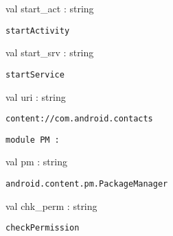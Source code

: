 \documentclass[11pt]{article}
\begin{document}
\begin{ocamldocsigend}
\begin{ocamldocdescription}
\end{ocamldocdescription}


\label{val:Android.Content.start-underscoreact}\begin{ocamldoccode}
val start_act : string
\end{ocamldoccode}
\begin{ocamldocdescription}
{\tt{startActivity}}


\end{ocamldocdescription}


\label{val:Android.Content.start-underscoresrv}\begin{ocamldoccode}
val start_srv : string
\end{ocamldoccode}
\begin{ocamldocdescription}
{\tt{startService}}


\end{ocamldocdescription}


\label{val:Android.Content.uri}\begin{ocamldoccode}
val uri : string
\end{ocamldoccode}
\begin{ocamldocdescription}
{\tt{content://com.android.contacts}}


\end{ocamldocdescription}


\begin{ocamldoccode}
{\tt{module }}{\tt{PM}}{\tt{ : }}\end{ocamldoccode}
\label{module:Android.Content.PM}
\begin{ocamldocsigend}


\label{val:Android.Content.PM.pm}\begin{ocamldoccode}
val pm : string
\end{ocamldoccode}
\begin{ocamldocdescription}
{\tt{android.content.pm.PackageManager}}


\end{ocamldocdescription}


\label{val:Android.Content.PM.chk-underscoreperm}\begin{ocamldoccode}
val chk_perm : string
\end{ocamldoccode}
\begin{ocamldocdescription}
{\tt{checkPermission}}


\end{ocamldocdescription}
\end{ocamldocsigend}


\end{ocamldocsigend}
\end{document}
